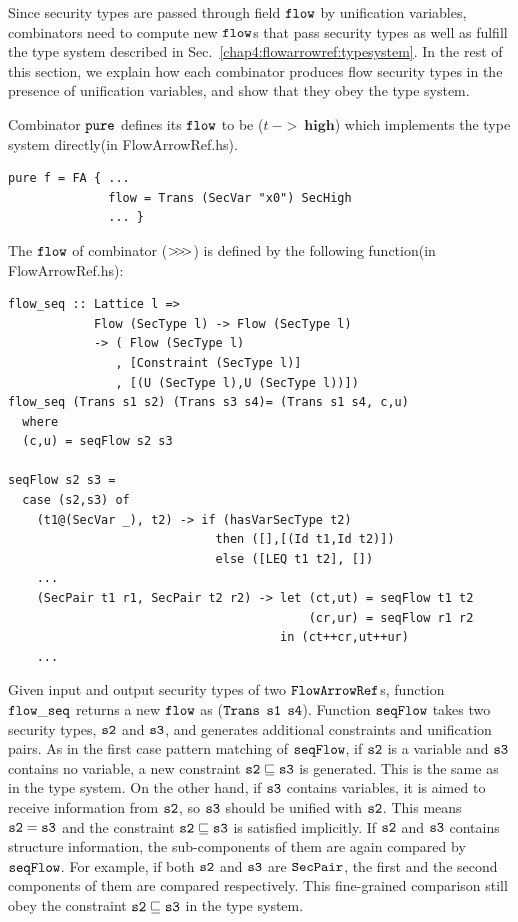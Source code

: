 \documentclass{report}
\newcommand{\arrowop}[1]{$#1\negthickspace #1\negthickspace #1$}
\newcommand{\co}[1]{$\cod{#1}$}
\begin{document}
Since security types are passed through field \co{flow} by unification variables,
combinators need to compute new \co{flow}s that pass 
security types as well as fulfill the type system described in Sec.~\ref{chap4:flowarrowref:typesystem}.
In the rest of this section, we explain how each combinator produces flow security types in the presence
of unification variables, and show that they obey the type system.

Combinator \co{pure} defines its \co{flow} to be ($t~->~\mathbf{high}$) which implements the type system
directly(in FlowArrowRef.hs).
\begin{Verbatim}[fontsize=\small]
pure f = FA { ...
              flow = Trans (SecVar "x0") SecHigh
              ... }
\end{Verbatim}
The \co{flow} of combinator (\arrowop{>}) is defined by the following function(in FlowArrowRef.hs):
\begin{Verbatim}[fontsize=\small]
flow_seq :: Lattice l => 
            Flow (SecType l) -> Flow (SecType l)
            -> ( Flow (SecType l)
               , [Constraint (SecType l)]
               , [(U (SecType l),U (SecType l))])
flow_seq (Trans s1 s2) (Trans s3 s4)= (Trans s1 s4, c,u)
  where
  (c,u) = seqFlow s2 s3

seqFlow s2 s3 =
  case (s2,s3) of
    (t1@(SecVar _), t2) -> if (hasVarSecType t2)
                             then ([],[(Id t1,Id t2)])
                             else ([LEQ t1 t2], [])
    ...
    (SecPair t1 r1, SecPair t2 r2) -> let (ct,ut) = seqFlow t1 t2
                                          (cr,ur) = seqFlow r1 r2
                                      in (ct++cr,ut++ur)
    ...
\end{Verbatim}
Given input and output security types of two \co{FlowArrowRef}s, function \co{flow\_seq} returns a new \co{flow}
as (\co{Trans} \co{s1} \co{s4}).
Function \co{seqFlow} takes two security types, \co{s2} and \co{s3}, and generates additional constraints and 
unification pairs. 
As in the first case pattern matching of \co{seqFlow}, if \co{s2} is a variable and \co{s3} contains no variable, 
a new constraint $\mathtt{s2}\sqsubseteq \mathtt{s3}$ is generated. This is the same as in the type system.
On the other hand, if \co{s3} contains variables, it is aimed to receive information from \co{s2}, so \co{s3}
should be unified with \co{s2}. This means $\mathtt{s2}=\mathtt{s3}$ and the constraint 
$\mathtt{s2}\sqsubseteq \mathtt{s3}$ is satisfied implicitly. 
If \co{s2} and \co{s3} contains structure information, the sub-components of them are again compared by \co{seqFlow}.
For example, if both \co{s2} and \co{s3} are \co{SecPair}, the first and the second components of them are
compared respectively. 
This fine-grained comparison still obey the constraint $\mathtt{s2}\sqsubseteq \mathtt{s3}$ in the type system.
\end{document}
